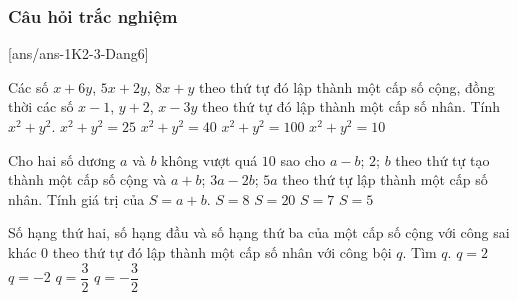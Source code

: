 \subsubsection{Câu hỏi trắc nghiệm}
[ans/ans-1K2-3-Dang6]
\begin{ex}%
	Các số $x+6y$, $5x+2y$, $8x+y$ theo thứ tự đó lập thành một cấp số cộng, đồng thời các số $x-1$, $y+2$, $x-3y$ theo thứ tự đó lập thành một cấp số nhân. Tính $x^2+y^2$.
	\choice
	{$x^2+y^2=25$}
	{\True $x^2+y^2=40$}
	{$x^2+y^2=100$}
	{$x^2+y^2=10$}
\end{ex}

\begin{ex}%
	Cho hai số dương $ a $ và $ b $ không vượt quá $ 10 $ sao cho $ a-b $; $ 2 $; $ b $ theo thứ tự tạo thành một cấp số cộng và $ a+b $; $ 3a-2b $; $ 5a $ theo thứ tự lập thành một cấp số nhân. Tính giá trị của $ S=a+b $.
	\choice
	{$ S=8 $}
	{$ S=20 $}
	{$ S=7 $}
	{\True $ S=5 $}
\end{ex}
\begin{ex}%
	Số hạng thứ hai, số hạng đầu và số hạng thứ ba của một cấp số cộng với công sai khác 0 theo thứ tự đó lập thành một cấp số nhân với công bội $q$. Tìm $q$.
	\choice
	{$q=2$}
	{\True $q=-2$}
	{$q=\dfrac{3}{2}$}
	{$q=-\dfrac{3}{2}$}
\end{ex}


